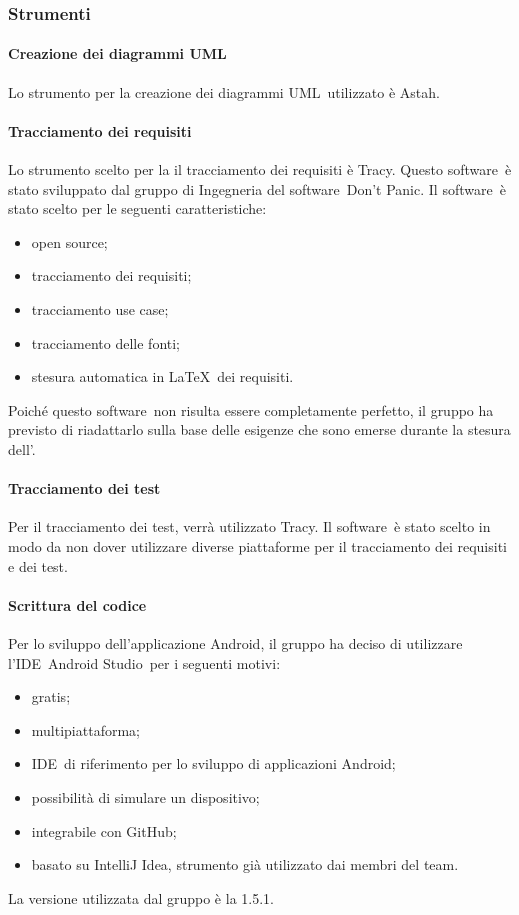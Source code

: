 \documentclass[../NormeProgetto.text]{subfiles}
\begin{document}
		\subsubsection{Strumenti}
			\paragraph{Creazione dei diagrammi UML}
				Lo strumento per la creazione dei diagrammi UML\g\ utilizzato è Astah\g.
			\paragraph{Tracciamento dei requisiti}
				Lo strumento scelto per la il tracciamento dei requisiti è Tracy\g. Questo software\g\ è stato sviluppato dal gruppo di Ingegneria del software\g\ Don't Panic. Il software\g\ è stato scelto per le seguenti caratteristiche:
			\begin{itemize}
				\item open source\g;
				\item tracciamento dei requisiti;
				\item tracciamento use case;
				\item tracciamento delle fonti;
				\item stesura automatica in \LaTeX\g\ dei requisiti.
			\end{itemize}
               Poiché questo software\g\ non risulta essere completamente perfetto, il gruppo ha previsto di riadattarlo sulla base delle esigenze che sono emerse durante la stesura dell'\analisideirequisiti .
 			\paragraph{Tracciamento dei test}
 				Per il tracciamento dei test, verrà utilizzato Tracy\g. Il software\g\ è stato scelto in modo da non dover utilizzare diverse piattaforme per il tracciamento dei requisiti e dei test.
			\paragraph{Scrittura del codice} 			
 				Per lo sviluppo dell'applicazione Android\g, il gruppo ha deciso di utilizzare l'IDE\g\ Android Studio\g\ per i seguenti motivi:
 				\begin{itemize}
 					\item gratis;
 					\item multipiattaforma;
 					\item IDE\g\ di riferimento per lo sviluppo di applicazioni Android\g;
 					\item possibilità di simulare un dispositivo;
 					\item integrabile con GitHub\g;
 					\item basato su IntelliJ Idea\g, strumento già utilizzato dai membri del team\g.
 				\end{itemize}
 				La versione utilizzata dal gruppo è la 1.5.1.
 				
\end{document}
